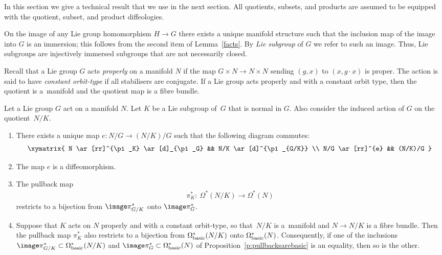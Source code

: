 In this section we give a technical result that we use in the next section.
All quotients, subsets, and products are assumed to be equipped
with the quotient, subset, and product dif\/feologies.

On the image of any Lie group homomorphism $H \to G$
there exists a unique manifold structure
such that the inclusion map of the image into $G$ is an immersion;
this follows from the second item of Lemma~\ref{facts}.
By \emph{Lie subgroup} of $G$ we refer to such an image.
Thus, Lie subgroups are injectively immersed subgroups
that are not necessarily closed.

Recall that a Lie group $G$ acts \emph{properly} on a manifold $N$
if the map $G\times N\to N\times N$ sending $(g,x)$ to $(x,g\cdot x)$
is proper. The action is said to have \emph{constant orbit-type}
if all stabilisers are conjugate.
If a Lie group acts properly and with a constant orbit type,
then the quotient is a~mani\-fold and the quotient map is a f\/ibre bundle.

\begin{Lemma} \label{l:q in stages}
Let a Lie group $G$ act on a manifold $N$.
Let $K$ be a Lie subgroup of~$G$
that is normal in $G$.
Also consider the induced action of $G$ on the quotient~$N/K$.
\begin{enumerate}\itemsep=0pt
\item[$(i)$]
There exists a unique map $ e \colon N/G \to (N/K) / G $
such that the following diagram commutes:
\begin{gather} \label{diagram q in stages}
\begin{split}
   \xymatrix{
 N \ar[rr]^{\pi_K} \ar[d]_{\pi_G} && N/K \ar[d]^{\pi_{G/K}} \\
 N/G \ar[rr]^{e} &&  (N/K)/G
}
\end{split}
\end{gather}

\item[$(ii)$]
The map $e$ is a diffeomorphism.

\item[$(iii)$]
The pullback map
\begin{gather*} \pi_K^* \colon \ \Omega^*(N/K) \to \Omega^*(N) \end{gather*}
restricts to a bijection from $\image \pi_{G/K}^*$ onto $\image \pi_G^*$.

\item[$(iv)$]
Suppose that $K$ acts on $N$ properly and with a constant orbit-type,
so that~$N/K$ is a~mani\-fold and $N \to N/K$ is a fibre bundle.
Then the pullback map $\pi_K^*$ also restricts to a bijection
from $\Omega^*_{\rm basic}(N/K)$ onto $\Omega^*_{\rm basic}(N)$.
Consequently, if one of the inclusions
$\image \pi_{G/K}^* \subset \Omega^*_{\rm basic}(N/K)$
and
$\image \pi_G^* \subset \Omega^*_{\rm basic}(N)$
of Proposition~{\rm \ref{p:pullbacksarebasic}} is an equality,
then so is the other.
\end{enumerate}
\end{Lemma}

